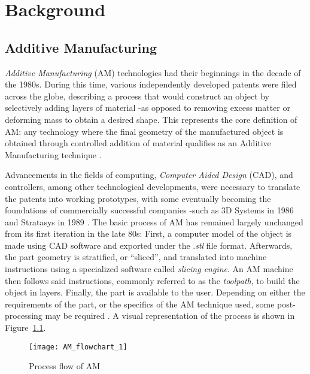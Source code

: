 \documentclass[main.tex]{subfiles}
\begin{document}
\chapter{Background} \label{ch:bg}
\section{Additive Manufacturing}\label{sec:AM} %
\emph{Additive Manufacturing} (AM) technologies had their beginnings in the decade of the 1980s. During this time, various independently developed patents were filed across the globe, describing a process that would construct an object by selectively adding layers of material -as opposed to removing excess matter or deforming mass to obtain a desired shape. This represents the core definition of AM: any technology where the final geometry of the manufactured object is obtained through controlled addition of material qualifies as an Additive Manufacturing technique \cite{Gibson2015}.

Advancements in the fields of computing, \emph{Computer Aided Design} (CAD), and controllers, among other technological developments, were necessary to translate the patents into working prototypes, with some eventually becoming the foundations of commercially successful companies -such as 3D Systems in 1986 and Stratasys in 1989 \cite{Gibson2015,3DSystems,Stratasys2017}. The basic process of AM has remained largely unchanged from its first iteration in the late 80s: First, a computer model of the object is made using CAD software and exported under the .\emph{stl} file format. Afterwards, the part geometry is stratified, or \textquotedblleft sliced\textquotedblright, and translated into machine instructions using a specialized software called \emph{slicing engine}. An AM machine then follows said instructions, commonly referred to as the \emph{toolpath}, to build the object in layers. Finally, the part is available to the user. Depending on either the requirements of the part, or the specifics of the AM technique used, some post-processing may be required \cite{Gibson2015}. A visual representation of the process is shown in Figure~\ref{fig:AM_flow}.

\begin{figure}[h]
	\center
	\texttt{[image: AM\_flowchart\_1]}
	\caption{Process flow of AM} \label{fig:AM_flow}
\end{figure}
\pagebreak %
 
\end{document}
